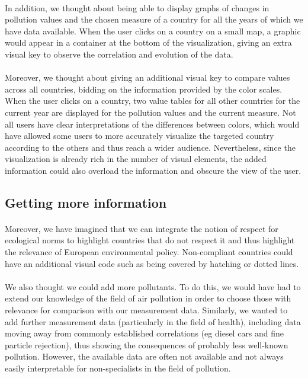 \documentclass[preprint,journal]{vgtc}       %
\begin{document}
\paragraph{}
In addition, we thought about being able to display graphs of changes in pollution values ​​and the chosen measure of a country for all the years of which we have data available. When the user clicks on a country on a small map, a graphic would appear in a container at the bottom of the visualization, giving an extra visual key to observe the correlation and evolution of the data. 

\paragraph{}
Moreover, we thought about giving an additional visual key to compare values ​​across all countries, bidding on the information provided by the color scales. When the user clicks on a country, two value tables for all other countries for the current year are displayed for the pollution values ​​and the current measure. Not all users have clear interpretations of the differences between colors, which would have allowed some users to more accurately visualize the targeted country according to the others and thus reach a wider audience. Nevertheless, since the visualization is already rich in the number of visual elements, the added information could also overload the information and obscure the view of the user.


\subsection{Getting more information}

\paragraph{}
Moreover, we have imagined that we can integrate the notion of respect for ecological norms to highlight countries that do not respect it and thus highlight the relevance of European environmental policy. Non-compliant countries could have an additional visual code such as being covered by hatching or dotted lines.

\paragraph{}
We also thought we could add more pollutants. To do this, we would have had to extend our knowledge of the field of air pollution in order to choose those with relevance for comparison with our measurement data. Similarly, we wanted to add further measurement data (particularly in the field of health), including data moving away from commonly established correlations (eg diesel cars and fine particle rejection), thus showing the consequences of probably less well-known pollution. However, the available data are often not available and not always easily interpretable for non-specialists in the field of pollution.
		
\end{document}
